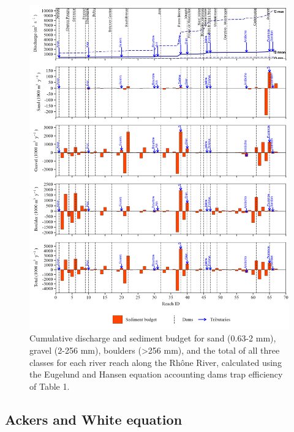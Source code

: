 \documentclass[
]{book}
\begin{document}
\begin{figure}
\includegraphics[width=26.24in]{img/res_cascade/res_E2_eE&H/plots_sed_budget-silt/sed_bud_res_sum_hy_E2_eE&H} \caption{Cumulative discharge and sediment budget for sand (0.63-2 mm), gravel (2-256 mm), boulders (>256 mm), and the total of all three classes for each river reach along the Rhône River, calculated using the Eugelund and Hansen equation accounting dams trap efficiency of Table 1.}\label{fig:budgetE2eE}
\end{figure}

\subsection{Ackers and White equation}\label{ackers-and-white-equation-2}
\end{document}
